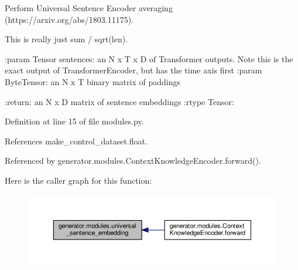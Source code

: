 \begin{DoxyVerb}Perform Universal Sentence Encoder averaging (https://arxiv.org/abs/1803.11175).

This is really just sum / sqrt(len).

:param Tensor sentences: an N x T x D of Transformer outputs. Note this is
    the exact output of TransformerEncoder, but has the time axis first
:param ByteTensor: an N x T binary matrix of paddings

:return: an N x D matrix of sentence embeddings
:rtype Tensor:
\end{DoxyVerb}
 

Definition at line 15 of file modules.\+py.



References make\+\_\+control\+\_\+dataset.\+float.



Referenced by generator.\+modules.\+Context\+Knowledge\+Encoder.\+forward().

Here is the caller graph for this function\+:
\nopagebreak
\begin{figure}[H]
\begin{center}
\leavevmode
\includegraphics[width=350pt]{namespacegenerator_1_1modules_ad34b3a76c4bcf6de5e890a2102d3254d_icgraph}
\end{center}
\end{figure}
